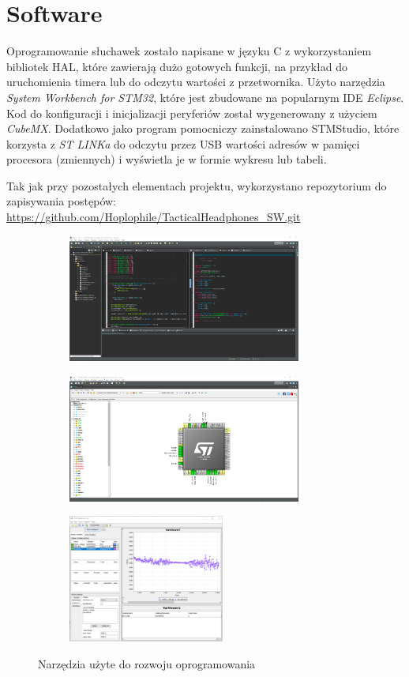 \chapter{Software}
\label{cha:software}

Oprogramowanie słuchawek zostało napisane w języku C z wykorzystaniem bibliotek HAL, które zawierają dużo gotowych funkcji, na przykład do uruchomienia timera lub do odczytu wartości z przetwornika. Użyto narzędzia \textit{System Workbench for STM32}, które jest zbudowane na popularnym IDE \textit{Eclipse}. Kod do konfiguracji i inicjalizacji peryferiów został wygenerowany z użyciem \textit{CubeMX}. Dodatkowo jako program pomocniczy zainstalowano STMStudio, które korzysta z \textit{ST LINKa} do odczytu przez USB wartości adresów w pamięci procesora (zmiennych) i wyświetla je w formie wykresu lub tabeli.

Tak jak przy pozostałych elementach projektu, wykorzystano repozytorium do zapisywania postępów: \url{https://github.com/Hoplophile/TacticalHeadphones_SW.git}

\begin{figure}[H]
	\centering
	\begin{subfigure}{.48\textwidth}
		\centering
		\includegraphics[height=4.2cm]{zdjecia/eclipse.png}
	\end{subfigure}
	\begin{subfigure}{.48\textwidth}
		\centering
		\includegraphics[height=4.2cm]{zdjecia/cubemx.png}
	\end{subfigure}
	\begin{subfigure}{.48\textwidth}
		\centering
		\includegraphics[height=4.2cm]{zdjecia/stmstudio.png}
	\end{subfigure}
	\caption{\label{pic:IDE} Narzędzia użyte do rozwoju oprogramowania}
\end{figure}

